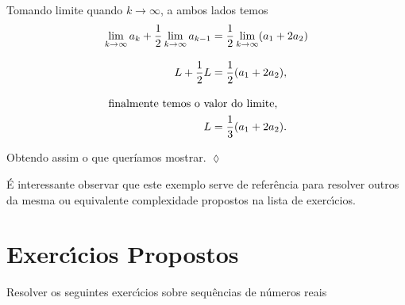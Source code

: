 Tomando limite quando $k\to\infty$, a ambos lados temos
\begin{align*}
\lim_{k\to\infty}a_k+\frac{1}{2}\lim_{k\to\infty}a_{k-1}&=
\frac{1}{2}\lim_{k\to\infty}(a_1+2a_2)\\[2ex]
 L+ \frac{1}{2}L &=\frac{1}{2}(a_1+2a_2 ),\\[2ex]
  \intertext{ finalmente temos o valor do limite, }
  L &= \frac{1}{3}(a_1+2a_2).
\end{align*}

Obtendo assim o que queríamos mostrar. \hfill \(\lozenge\)

\'{E} interessante observar que este exemplo serve de refer\^{e}ncia para
resolver outros da mesma ou equivalente complexidade propostos na
lista de exerc\'{\i}cios.

\section*{Exerc\'{\i}cios Propostos}
Resolver os seguintes exerc\'{\i}cios sobre sequ\^{e}ncias de n\'{u}meros reais
